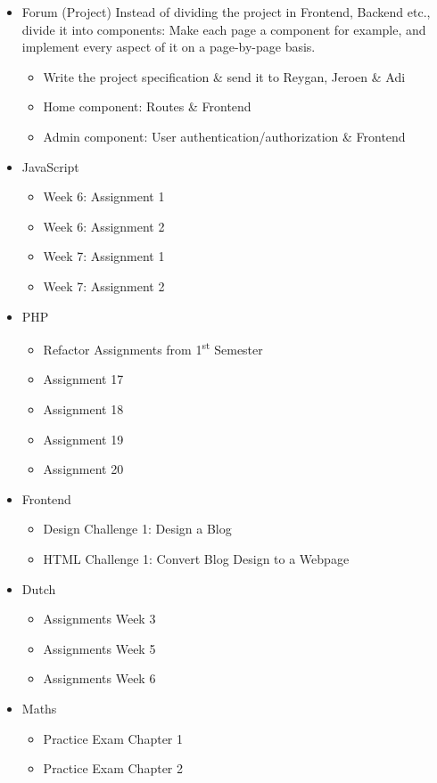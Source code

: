 \documentclass[12pt]{book}
\begin{document}
\begin{itemize}
  \item Forum (Project)
    Instead of dividing the project in Frontend, Backend etc., divide it into components:
    Make each page a component for example, and implement every aspect of it on a page-by-page
    basis.    
    \begin{itemize}
      \item Write the project specification \& send it to Reygan, Jeroen \& Adi
      \item Home component: Routes \& Frontend
      \item Admin component: User authentication/authorization & Frontend
    \end{itemize}
  \item JavaScript
    \begin{itemize}
      \item Week 6: Assignment 1
      \item Week 6: Assignment 2
      \item Week 7: Assignment 1
      \item Week 7: Assignment 2
    \end{itemize}
  \item PHP
    \begin{itemize}
      \item Refactor Assignments from 1\textsuperscript{st} Semester
      \item Assignment 17
      \item Assignment 18
      \item Assignment 19
      \item Assignment 20
    \end{itemize}
  \item Frontend
      \begin{itemize}
        \item Design Challenge 1: Design a Blog
        \item HTML Challenge 1: Convert Blog Design to a Webpage
      \end{itemize}
  \item Dutch
    \begin{itemize}
      \item Assignments Week 3
      \item Assignments Week 5
      \item Assignments Week 6
    \end{itemize}
  \item Maths
    \begin{itemize}
      \item Practice Exam Chapter 1
      \item Practice Exam Chapter 2
    \end{itemize}
\end{itemize}
\end{document}
